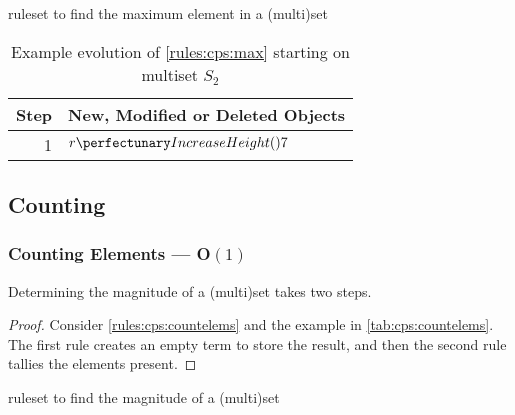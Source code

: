 \begin{cprulesetfloat}
\begin{cpruleset}


\end{cpruleset}
\caption{\label{rules:cps:max}\Gls{ruleset} to find the maximum element in a (multi)set}
\end{cprulesetfloat}

\begin{table} \centering
\begin{tabular}{|r|l|}
    \hline
    \textbf{Step} & \textbf{New, Modified or Deleted Objects} \\ \hline
    1 & \(\cpfunc{r}{7}\)\\ \hline
\end{tabular} 
\caption[Example evolution of \cref{rules:cps:max}]{\label{tab:cps:max}Example evolution of \cref{rules:cps:max} starting on multiset \(S_2\)}
\end{table}


\subsection{Counting}\label{sec:cps:counting}

\subsubsection{Counting Elements --- O\((1)\)}\label{sec:cps:countelems}

\begin{proposition}\label{prop:cps:countelems}
Determining the magnitude of a (multi)set takes two steps.
\end{proposition}

\begin{proof}
Consider \cref{rules:cps:countelems} and the example in \cref{tab:cps:countelems}.  The first rule creates an empty term to store the result, and then the second rule tallies the elements present.
\end{proof}

\begin{cprulesetfloat} \begin{cpruleset}



\end{cpruleset}
\caption{\label{rules:cps:countelems}\Gls{ruleset} to find the magnitude of a (multi)set}
\end{cprulesetfloat}

